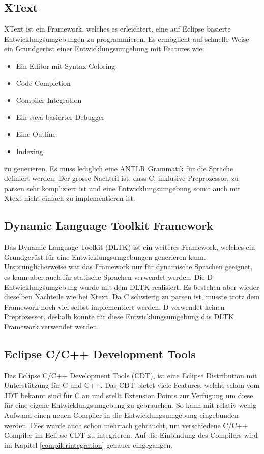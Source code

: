 \subsection{XText}
XText ist ein Framework, welches es erleichtert, eine auf Eclipse basierte Entwicklungsumgebungen zu programmieren. Es ermöglicht auf schnelle Weise ein Grundgerüst einer Entwicklungsumgebung mit Features wie:

\begin{itemize} 
	\item Ein Editor mit Syntax Coloring
	\item Code Completion
	\item Compiler Integration
	\item Ein Java-basierter Debugger
	\item Eine Outline
	\item Indexing
\end{itemize}

zu generieren. \cite{xtext} Es muss lediglich eine ANTLR\cite{antlr} Grammatik für die Sprache definiert werden. Der grosse Nachteil ist, dass C, inklusive Preprozessor, zu parsen sehr kompliziert ist und eine Entwicklungsumgebung somit auch mit Xtext nicht einfach zu implementieren ist.

\subsection{Dynamic Language Toolkit Framework}
Das Dynamic Language Toolkit (DLTK) ist ein weiteres Framework, welches ein Grundgerüst für eine Entwicklungsumgebungen generieren kann. Ursprünglicherweise war das Framework nur für dynamische Sprachen geeignet, es kann aber auch für statische Sprachen verwendet werden. Die D Entwicklungsumgebung wurde mit dem DLTK realisiert\cite{ddt}. Es bestehen aber wieder dieselben Nachteile wie bei Xtext. Da C schwierig zu parsen ist, müsste trotz dem Framework noch viel selbst implementiert werden. D verwendet keinen Preprozessor, deshalb konnte für diese Entwicklungsumgebung das DLTK Framework verwendet werden.

\subsection{Eclipse C/C++ Development Tools}
Das Eclipse C/C++ Development Tools (CDT), ist eine Eclipse Distribution mit Unterstützung für C und C++. Das CDT bietet viele Features, welche schon vom JDT bekannt sind für C an und stellt Extension Points zur Verfügung um diese für eine eigene Entwicklungsumgebung zu gebrauchen. So kann mit relativ wenig Aufwand einen neuen Compiler in die Entwicklungsumgebung eingebunden werden. Dies wurde auch schon mehrfach gebraucht, um verschiedene C/C++ Compiler im Eclipse CDT zu integrieren. Auf die Einbindung des Compilers wird im Kapitel \ref{compilerintegration} genauer eingegangen.

